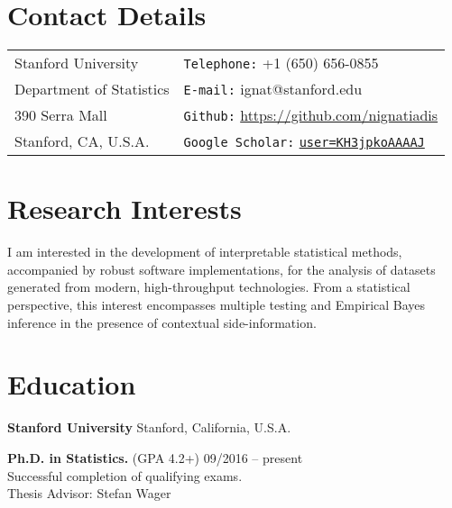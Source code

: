 \documentclass[margin,line]{res}
\newcommand{\g}{\textgreek}
\newenvironment{list1}{
  \begin{list}{\ding{113}}{%
      \setlength{\itemsep}{0in}
      \setlength{\parsep}{0in} \setlength{\parskip}{0in}
      \setlength{\topsep}{0in} \setlength{\partopsep}{0in}
      \setlength{\leftmargin}{0.17in}}}{\end{list}}
\begin{document}

\begin{resume}
\section{\sc Contact Details}
\vspace{.05in}
\begin{tabular}{@{}p{2in}p{4in}}
Stanford University             & {\tt Telephone:}  +1 (650) 656-0855 \\
Department of Statistics   & {\tt E-mail:}    ignat@stanford.edu \\
390 Serra Mall &  {\tt Github:} \url{https://github.com/nignatiadis}\\
Stanford, CA, U.S.A.  & {\tt Google Scholar:} \href{https://scholar.google.com/citations?user=KH3jpkoAAAAJ}{\tt user=KH3jpkoAAAAJ} \\
\end{tabular}



\section{\sc Research Interests}
I am interested in the development of interpretable statistical methods, accompanied by robust software implementations, for the analysis of datasets generated from modern, high-throughput technologies. From a statistical perspective, this interest encompasses multiple testing and Empirical Bayes inference in the presence of contextual side-information.

\section{\sc Education}
{\bf Stanford University} \hfill Stanford, California, U.S.A.\\
\vspace*{-.14in}
\begin{list1}
\item[]
\textbf{Ph.D. in Statistics.}  (GPA 4.2+) \hfill  09/2016 -- present\\
Successful completion of qualifying exams.\\
Thesis Advisor: Stefan Wager
\end{list1}


\end{resume}
\end{document}
